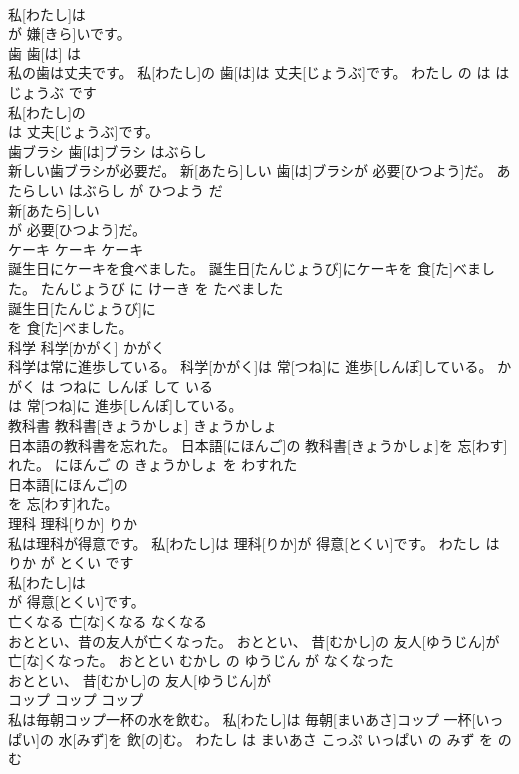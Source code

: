 \documentclass[8pt]{extreport}
\begin{document}
\begin{CJK}{UTF8}{min}
\\	私[わたし]は
\\	が 嫌[きら]いです。		
\\	歯	歯[は]	は	
\\	私の歯は丈夫です。	私[わたし]の 歯[は]は 丈夫[じょうぶ]です。	わたし の は は じょうぶ です	
\\	私[わたし]の
\\	は 丈夫[じょうぶ]です。		
\\	歯ブラシ	歯[は]ブラシ	はぶらし	
\\	新しい歯ブラシが必要だ。	新[あたら]しい 歯[は]ブラシが 必要[ひつよう]だ。	あたらしい はぶらし が ひつよう だ	
\\	新[あたら]しい
\\	が 必要[ひつよう]だ。		
\\	ケーキ	ケーキ	ケーキ	
\\	誕生日にケーキを食べました。	誕生日[たんじょうび]にケーキを 食[た]べました。	たんじょうび に けーき を たべました	
\\	誕生日[たんじょうび]に
\\	を 食[た]べました。		
\\	科学	科学[かがく]	かがく	
\\	科学は常に進歩している。	科学[かがく]は 常[つね]に 進歩[しんぽ]している。	かがく は つねに しんぽ して いる	
\\	は 常[つね]に 進歩[しんぽ]している。		
\\	教科書	教科書[きょうかしょ]	きょうかしょ	
\\	日本語の教科書を忘れた。	日本語[にほんご]の 教科書[きょうかしょ]を 忘[わす]れた。	にほんご の きょうかしょ を わすれた	
\\	日本語[にほんご]の
\\	を 忘[わす]れた。		
\\	理科	理科[りか]	りか	
\\	私は理科が得意です。	私[わたし]は 理科[りか]が 得意[とくい]です。	わたし は りか が とくい です	
\\	私[わたし]は
\\	が 得意[とくい]です。		
\\	亡くなる	亡[な]くなる	なくなる	
\\	おととい、昔の友人が亡くなった。	おととい、 昔[むかし]の 友人[ゆうじん]が 亡[な]くなった。	おととい むかし の ゆうじん が なくなった	
\\	おととい、 昔[むかし]の 友人[ゆうじん]が
\\	コップ	コップ	コップ	
\\	私は毎朝コップ一杯の水を飲む。	私[わたし]は 毎朝[まいあさ]コップ 一杯[いっぱい]の 水[みず]を 飲[の]む。	わたし は まいあさ こっぷ いっぱい の みず を のむ	

\end{CJK}
\end{document}
